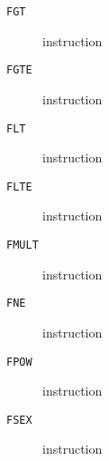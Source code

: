 \begin{description}
\item[\texttt{FGT}] instruction\\

\end{description}
\clearpage
\begin{description}
\item[\texttt{FGTE}] instruction\\

\end{description}
\clearpage
\begin{description}
\item[\texttt{FLT}] instruction\\

\end{description}
\clearpage
\begin{description}
\item[\texttt{FLTE}] instruction\\

\end{description}
\clearpage
\begin{description}
\item[\texttt{FMULT}] instruction\\

\end{description}
\clearpage
\begin{description}
\item[\texttt{FNE}] instruction\\

\end{description}
\clearpage
\begin{description}
\item[\texttt{FPOW}] instruction\\

\end{description}
\clearpage
\begin{description}
\item[\texttt{FSEX}] instruction\\

\end{description}

